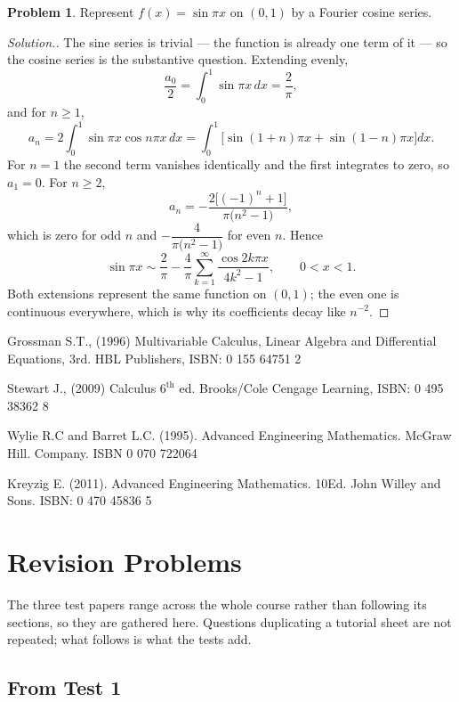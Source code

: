 \documentclass[11pt,a4paper]{article}
\theoremstyle{definition}
\newtheorem{problemx}{Problem}[subsection]
\newenvironment{problem}{\begin{problemx}}{\end{problemx}}
\newenvironment{solution}
  {\renewcommand{\qedsymbol}{}\begin{proof}[\textit{Solution}.]}
  {\end{proof}}
\begin{document}
\begin{problem}
Represent $f(x) = \sin\pi x$ on $(0,1)$ by a Fourier cosine series.
\end{problem}
\begin{solution}
The sine series is trivial --- the function is already one term of it --- so the
cosine series is the substantive question. Extending evenly,
$$\frac{a_0}{2} = \int_0^1\sin\pi x\,dx = \frac{2}{\pi},$$
and for $n\geq 1$,
$$a_n = 2\int_0^1\sin\pi x\cos n\pi x\,dx
= \int_0^1\Big[\sin(1+n)\pi x + \sin(1-n)\pi x\Big]dx .$$
For $n=1$ the second term vanishes identically and the first integrates to
zero, so $a_1 = 0$. For $n\geq 2$,
$$a_n = -\frac{2\big[(-1)^n+1\big]}{\pi\big(n^2-1\big)},$$
which is zero for odd $n$ and $-\dfrac{4}{\pi\big(n^2-1\big)}$ for even $n$.
Hence
$$\sin\pi x \sim \frac{2}{\pi}
- \frac{4}{\pi}\sum_{k=1}^{\infty}\frac{\cos 2k\pi x}{4k^2-1},
\qquad 0<x<1 .$$
Both extensions represent the same function on $(0,1)$; the even one is
continuous everywhere, which is why its coefficients decay like $n^{-2}$.
\end{solution}


\begin{thebibliography}{}

Grossman S.T., (1996) Multivariable Calculus, Linear Algebra and Differential Equations, 3rd. HBL Publishers, ISBN: 0 155 64751 2

Stewart J., (2009) Calculus $6^{\text{th}}$ ed. Brooks/Cole Cengage Learning, ISBN: 0 495 38362 8

Wylie R.C and Barret L.C. (1995). Advanced Engineering Mathematics. McGraw Hill. Company. ISBN 0 070 722064

Kreyzig E. (2011). Advanced Engineering Mathematics. 10Ed. John Willey and Sons. ISBN: 0 470 45836 5

\end{thebibliography}

\pagebreak

\section{Revision Problems}

The three test papers range across the whole course rather than following its
sections, so they are gathered here. Questions duplicating a tutorial sheet are
not repeated; what follows is what the tests add.

\subsection{From Test 1}
\end{document}

